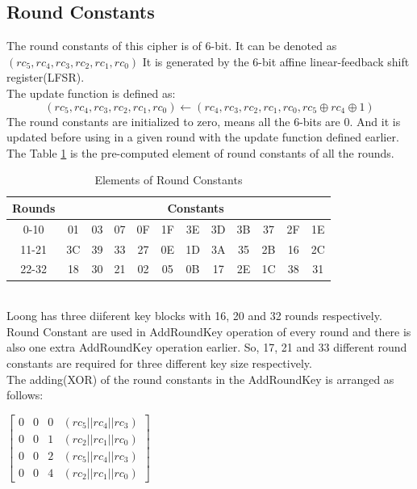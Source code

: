\documentclass[preprint]{transcrypto}
\begin{document}
\subsection{Round Constants}
The round constants of this cipher is of 6-bit. It can be denoted as $(rc_5, rc_4, rc_3, rc_2, rc_1, rc_0)$ It is generated by the 6-bit affine linear-feedback shift register(LFSR).\\
The update function is defined as:
\begin{equation}
    (rc_5, rc_4, rc_3, rc_2, rc_1, rc_0) \leftarrow (rc_4, rc_3, rc_2, rc_1, rc_0, rc_5 \oplus rc_4 \oplus 1)
\end{equation}
The round constants are initialized to zero, means all the 6-bits are 0. And it is updated before using in a given round with the update function defined earlier.\\
The Table \ref{table:roundconstant} is the pre-computed element of round constants of all the rounds.
\begin{table}[h!]
	\begin{center}
	\begin{tabular}{c| c c c c c c c c c c c}
	    \hline
	    Rounds & \multicolumn{11}{c}{Constants}\\
		\hline
		0-10 & 01 & 03 & 07 & 0F & 1F & 3E & 3D & 3B & 37 & 2F & 1E\\
		11-21 & 3C & 39 & 33 & 27 & 0E & 1D & 3A & 35 & 2B & 16 & 2C\\
		22-32 & 18 & 30 & 21 & 02 & 05 & 0B & 17 & 2E & 1C & 38 & 31\\
		\hline
	\end{tabular}
	\end{center}
	\caption{Elements of Round Constants}
	\label{table:roundconstant}
\end{table}\\
Loong has three diiferent key blocks with 16, 20 and 32 rounds respectively. Round Constant are used in AddRoundKey operation of every round and there is also one extra AddRoundKey operation earlier. So, 17, 21 and 33 different round constants are required for three different key size respectively.\\ 
The adding(XOR) of the round constants in the AddRoundKey is arranged as follows: 
\begin{center}
    $\begin{bmatrix}
0 & 0 & 0 &(rc_5 || rc_4 || rc_3)\\
0 & 0 & 1 &(rc_2 || rc_1 || rc_0)\\
0 & 0 & 2 &(rc_5 || rc_4 || rc_3)\\
0 & 0 & 4 &(rc_2 || rc_1 || rc_0)
\end{bmatrix}$
\end{center}
\end{document}

